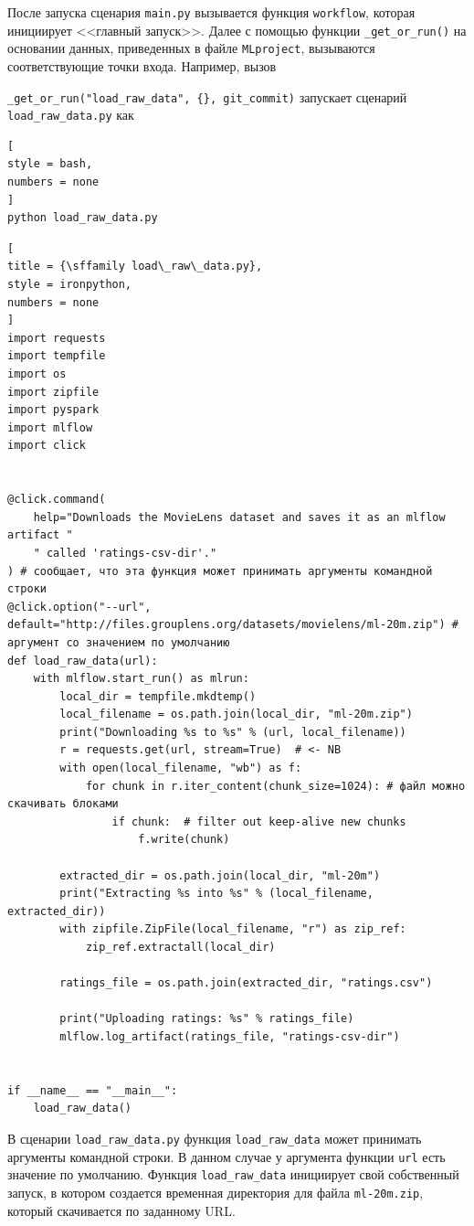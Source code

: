 \documentclass[%
	11pt,
	a4paper,
	utf8,
		]{article}
\begin{document}
После запуска сценария \texttt{main.py} вызывается функция \texttt{workflow}, которая инициирует <<главный запуск>>. Далее с помощью функции \verb|_get_or_run()| на основании данных, приведенных в файле \texttt{MLproject}, вызываются соответствующие точки входа. Например, вызов

\noindent\verb|_get_or_run("load_raw_data", {}, git_commit)|
запускает сценарий \texttt{load\_raw\_data.py} как
\begin{lstlisting}[
style = bash,
numbers = none	
]
python load_raw_data.py
\end{lstlisting}

\begin{lstlisting}[
title = {\sffamily load\_raw\_data.py},
style = ironpython,
numbers = none	
]
import requests
import tempfile
import os
import zipfile
import pyspark
import mlflow
import click


@click.command(
	help="Downloads the MovieLens dataset and saves it as an mlflow artifact "
	" called 'ratings-csv-dir'."
) # сообщает, что эта функция может принимать аргументы командной строки
@click.option("--url", default="http://files.grouplens.org/datasets/movielens/ml-20m.zip") # аргумент со значением по умолчанию
def load_raw_data(url):
	with mlflow.start_run() as mlrun:
		local_dir = tempfile.mkdtemp()
		local_filename = os.path.join(local_dir, "ml-20m.zip")
		print("Downloading %s to %s" % (url, local_filename))
		r = requests.get(url, stream=True)  # <- NB
		with open(local_filename, "wb") as f:
			for chunk in r.iter_content(chunk_size=1024): # файл можно скачивать блоками
				if chunk:  # filter out keep-alive new chunks
					f.write(chunk)

		extracted_dir = os.path.join(local_dir, "ml-20m")
		print("Extracting %s into %s" % (local_filename, extracted_dir))
		with zipfile.ZipFile(local_filename, "r") as zip_ref:
			zip_ref.extractall(local_dir)

		ratings_file = os.path.join(extracted_dir, "ratings.csv")

		print("Uploading ratings: %s" % ratings_file)
		mlflow.log_artifact(ratings_file, "ratings-csv-dir")


if __name__ == "__main__":
	load_raw_data()
\end{lstlisting}

В сценарии \texttt{load\_raw\_data.py} функция \texttt{load\_raw\_data} может принимать аргументы командной строки. В данном случае у аргумента функции \texttt{url} есть значение по умолчанию. Функция \texttt{load\_raw\_data} инициирует свой собственный запуск, в котором создается временная директория для файла \texttt{ml-20m.zip}, который скачивается по заданному URL.
\end{document}
